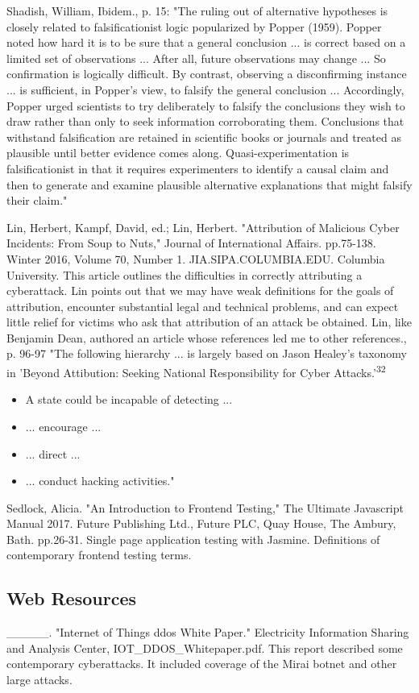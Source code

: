 Shadish, William, Ibidem., p. 15: "The ruling out of alternative hypotheses is closely related to falsificationist logic popularized by Popper (1959). Popper noted how hard it is to be sure that a general conclusion ... is correct based on a limited set of observations ... After all, future observations may change ... So confirmation is logically difficult. By contrast, observing a disconfirming instance ... is sufficient, in Popper's view, to falsify the general conclusion ... Accordingly, Popper urged scientists to try deliberately to falsify the conclusions they wish to draw rather than only to seek information corroborating them. Conclusions that withstand falsification are retained in scientific books or journals and treated as plausible until better evidence comes along. Quasi-experimentation is falsificationist in that it requires experimenters to identify a causal claim and then to generate and examine plausible alternative explanations that might falsify their claim."

Lin, Herbert, Kampf, David, ed.; Lin, Herbert. "Attribution of Malicious Cyber Incidents: From Soup to Nuts," Journal of International Affairs. pp.75-138. Winter 2016, Volume 70, Number 1. JIA.SIPA.COLUMBIA.EDU. Columbia University. This article outlines the difficulties in correctly attributing a cyberattack. Lin points out that we may have weak definitions for the goals of attribution, encounter substantial legal and technical problems, and can expect little relief for victims who ask that attribution of an \gls{attack} be obtained. Lin, like Benjamin Dean, authored an article whose references led me to other references., p. 96-97 "The following hierarchy ... is largely based on Jason Healey's taxonomy in 'Beyond Attibution: Seeking National Responsibility for Cyber Attacks.'\textsuperscript{32} \begin{itemize} \item A state could be incapable of detecting ... \item ... encourage ... \item ... direct ... \item ... conduct hacking activities." \end{itemize}

Sedlock, Alicia. "An Introduction to Frontend Testing," The Ultimate Javascript Manual 2017. Future Publishing Ltd., Future PLC, Quay House, The Ambury, Bath. pp.26-31. Single page application testing with Jasmine. Definitions of contemporary frontend testing terms.

\subsection{Web Resources}
\_\_\_\_\_. "Internet of Things \gls{ddos} White Paper." Electricity Information Sharing and Analysis Center, IOT\_DDOS\_Whitepaper.pdf. This report described some contemporary cyberattacks. It included coverage of the Mirai \gls{botnet} and other large attacks.

